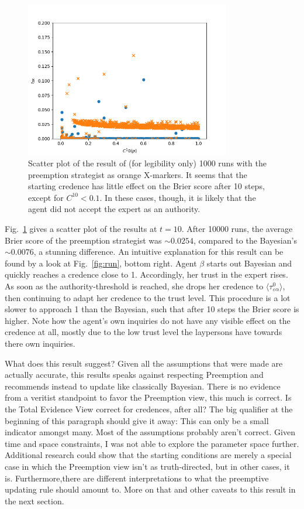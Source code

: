 \documentclass[11pt, a4paper]{article}
\renewcommand{\a}{\alpha}
\begin{document}
\begin{figure}
	\centering
\includegraphics[width=0.8\textwidth]{Result.png}
\caption{Scatter plot of the result of (for legibility only) 1000 runs with the preemption strategist as orange X-markers. It seems that the starting credence has little effect on the Brier score after 10 steps, except for $C^{10} < 0.1$. In these cases, though, it is likely that the agent did not accept the expert as an authority.\label{fig:res}}
\end{figure}

Fig.~\ref{fig:res} gives a scatter plot of the results at $t=10$. After 10000 runs, the average Brier score of the preemption strategist was $\sim0.0254$, compared to the Bayesian's $\sim0.0076$, a stunning difference. An intuitive explanation for this result can be found by a look at Fig.~\ref{fig:run}, bottom right. Agent $\beta$ starts out Bayesian and quickly reaches a credence close to 1. Accordingly, her trust in the expert rises. As soon as the authority-threshold is reached, she drops her credence to $\langle \tau^0_{\varepsilon\a} \rangle $, then continuing to adapt her credence to the trust level. This procedure is a lot slower to approach 1 than the Bayesian, such that after 10 steps the Brier score is higher. Note how the agent's own inquiries do not have any visible effect on the credence at all, mostly due to the low trust level the laypersons have towards there own inquiries.

What does this result suggest? Given all the assumptions that were made are actually accurate, this results speaks against respecting Preemption and recommends instead to update like classically Bayesian. There is no evidence from a veritist standpoint to favor the Preemption view, this much is correct. Is the Total Evidence View correct for credences, after all? The big qualifier at the beginning of this paragraph should give it away: This can only be a small indicator amongst many. Most of the assumptions probably aren't correct. Given time and space constraints, I was not able to explore the parameter space further. Additional research could show that the starting conditions are merely a special case in which the Preemption view isn't as truth-directed, but in other cases, it is. Furthermore,there are different interpretations to what the preemptive updating rule should amount to. More on that and other caveats to this result in the next section.
\end{document}
